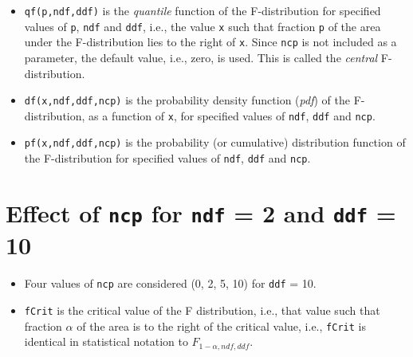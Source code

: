 \documentclass[]{book}
\providecommand{\tightlist}{%
  \setlength{\itemsep}{0pt}\setlength{\parskip}{0pt}}
\begin{document}
\begin{itemize}
\item
  \texttt{qf(p,ndf,ddf)} is the \emph{quantile} function of the F-distribution for specified values of \texttt{p}, \texttt{ndf} and \texttt{ddf}, i.e., the value \texttt{x} such that fraction \texttt{p} of the area under the F-distribution lies to the right of \texttt{x}. Since \texttt{ncp} is not included as a parameter, the default value, i.e., zero, is used. This is called the \emph{central} F-distribution.
\item
  \texttt{df(x,ndf,ddf,ncp)} is the probability density function (\emph{pdf}) of the F-distribution, as a function of \texttt{x}, for specified values of \texttt{ndf}, \texttt{ddf} and \texttt{ncp}.
\item
  \texttt{pf(x,ndf,ddf,ncp)} is the probability (or cumulative) distribution function of the F-distribution for specified values of \texttt{ndf}, \texttt{ddf} and \texttt{ncp}.
\end{itemize}

\hypertarget{effect-of-ncp-for-ndf-2-and-ddf-10}{%
\section{\texorpdfstring{Effect of \texttt{ncp} for \texttt{ndf} = 2 and \texttt{ddf} = 10}{Effect of ncp for ndf = 2 and ddf = 10}}\label{effect-of-ncp-for-ndf-2-and-ddf-10}}

\begin{itemize}
\tightlist
\item
  Four values of \texttt{ncp} are considered (0, 2, 5, 10) for \texttt{ddf} = 10.
\item
  \texttt{fCrit} is the critical value of the F distribution, i.e., that value such that fraction \(\alpha\) of the area is to the right of the critical value, i.e., \texttt{fCrit} is identical in statistical notation to \({{F}_{1-\alpha ,ndf,ddf}}\).
\end{itemize}
\end{document}
